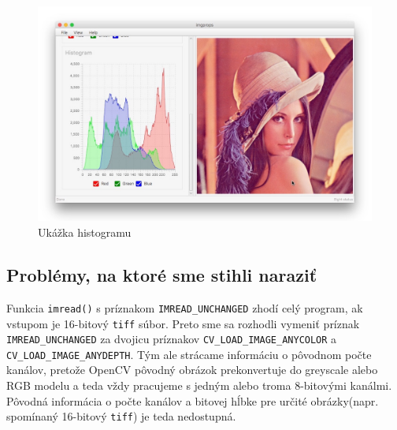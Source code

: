 \documentclass[12pt,a4paper,titlepage,final]{article}
\begin{document}
\begin{figure}[!h]
	\centering
	\includegraphics[width=15cm]{img/screenshot2.jpeg}
	\caption{Ukážka histogramu}
\end{figure}

\subsection{Problémy, na ktoré sme stihli naraziť}
Funkcia \verb|imread()| s príznakom \verb|IMREAD_UNCHANGED| zhodí celý program, ak vstupom je 16-bitový \verb|tiff| súbor. Preto sme sa rozhodli vymeniť príznak \verb|IMREAD_UNCHANGED| za dvojicu príznakov \verb|CV_LOAD_IMAGE_ANYCOLOR| a \verb|CV_LOAD_IMAGE_ANYDEPTH|. Tým ale strácame informáciu o pôvodnom počte kanálov, pretože OpenCV pôvodný obrázok prekonvertuje do greyscale alebo RGB modelu a teda vždy pracujeme s jedným alebo troma 8-bitovými kanálmi. Pôvodná informácia o počte kanálov a bitovej hĺbke pre určité obrázky(napr. spomínaný 16-bitový \verb|tiff|) je teda nedostupná.

\newpage
\end{document}
